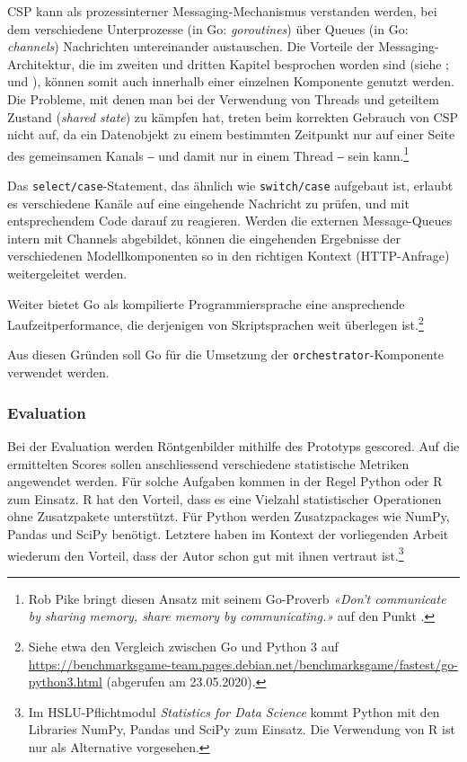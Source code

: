 CSP kann als prozessinterner Messaging-Mechanismus verstanden werden, bei dem verschiedene Unterprozesse (in Go: \textit{goroutines}) über Queues (in Go: \textit{channels}) Nachrichten untereinander austauschen. Die Vorteile der Messaging-Architektur, die im zweiten und dritten Kapitel besprochen worden sind (siehe ;  und ), können somit auch innerhalb einer einzelnen Komponente genutzt werden. Die Probleme, mit denen man bei der Verwendung von Threads und geteiltem Zustand (\textit{shared state}) zu kämpfen hat, treten beim korrekten Gebrauch von CSP nicht auf, da ein Datenobjekt zu einem bestimmten Zeitpunkt nur auf einer Seite des gemeinsamen Kanals ‒ und damit nur in einem Thread ‒ sein kann.\footnote{Rob Pike bringt diesen Ansatz mit seinem Go-Proverb \textit{«Don't communicate by sharing memory, share memory by communicating.»} auf den Punkt \cite[2:45]{go-proverbs}.}

Das \texttt{select/case}-Statement, das ähnlich wie \texttt{switch/case} aufgebaut ist, erlaubt es verschiedene Kanäle auf eine eingehende Nachricht zu prüfen, und mit entsprechendem Code darauf zu reagieren. Werden die externen Message-Queues intern mit Channels abgebildet, können die eingehenden Ergebnisse der verschiedenen Modellkomponenten so in den richtigen Kontext (HTTP-Anfrage) weitergeleitet werden.

Weiter bietet Go als kompilierte Programmiersprache eine ansprechende Laufzeitperformance, die derjenigen von Skriptsprachen weit überlegen ist.\footnote{Siehe etwa den Vergleich zwischen Go und Python 3 auf \url{https://benchmarksgame-team.pages.debian.net/benchmarksgame/fastest/go-python3.html} (abgerufen am 23.05.2020).}

Aus diesen Gründen soll Go für die Umsetzung der \texttt{orchestrator}-Komponente verwendet werden.

\subsubsection{Evaluation}
\label{sec:wahl-der-programmiersprache-evaluation}

Bei der Evaluation werden Röntgenbilder mithilfe des Prototyps gescored. Auf die ermittelten Scores sollen anschliessend verschiedene statistische Metriken angewendet werden. Für solche Aufgaben kommen in der Regel Python oder R zum Einsatz. R hat den Vorteil, dass es eine Vielzahl statistischer Operationen ohne Zusatzpakete unterstützt. Für Python werden Zusatzpackages wie NumPy, Pandas und SciPy benötigt. Letztere haben im Kontext der vorliegenden Arbeit wiederum den Vorteil, dass der Autor schon gut mit ihnen vertraut ist.\footnote{Im HSLU-Pflichtmodul \textit{Statistics for Data Science} kommt Python mit den Libraries NumPy, Pandas und SciPy zum Einsatz. Die Verwendung von R ist nur als Alternative vorgesehen.}

